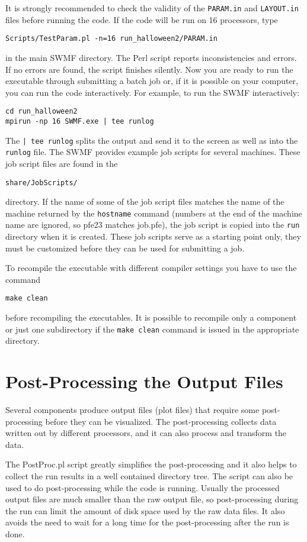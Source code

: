 It is strongly recommended to check the validity of the {\tt PARAM.in} and 
{\tt LAYOUT.in} files before running the code. If the
code will be run on 16 processors, type
\begin{verbatim}
Scripts/TestParam.pl -n=16 run_halloween2/PARAM.in
\end{verbatim}
in the main SWMF directory.
The Perl script reports inconsistencies and errors. 
If no errors are found, the script finishes silently.
Now you are ready to run the executable through submitting a batch job or, 
if it is possible on your computer, you can run the code interactively.  For
example, to run the SWMF interactively:
\begin{verbatim}
cd run_halloween2
mpirun -np 16 SWMF.exe | tee runlog
\end{verbatim}
The {\tt | tee runlog} splits the output and send it to the screen
as well as into the {\tt runlog} file.
The SWMF provides example job scripts for several machines. 
These job script files are found in the
\begin{verbatim}
share/JobScripts/
\end{verbatim}
directory. If the name of some of the job script files matches the
name of the machine returned by the {\tt hostname} command (numbers
at the end of the machine name are ignored, so pfe23 matches job.pfe), 
the job script is copied into the {\tt run} directory when it is created.
These job scripts serve as a starting point only, they must
be customized before they can be used for submitting a job.

To recompile the executable with different compiler settings you have
to use the command
\begin{verbatim}
make clean
\end{verbatim}
before recompiling the executables. It is possible to recompile
only a component or just one subdirectory if the {\tt make clean}
command is issued in the appropriate directory.

\section{Post-Processing the Output Files}

Several components produce output files (plot files) that require
some post-processing before they can be visualized. The post-processing
collects data written out by different processors, and it can also
process and transform the data. 

The PostProc.pl script greatly simplifies the post-processing and
it also helps to collect the run results in a well contained directory tree.
The script can also be used to do post-processing while the code is running.
Usually the processed output files are much smaller than the raw output file,
so post-processing during the run can limit the amount of disk space used
by the raw data files. It also avoids the need to wait for a long time 
for the post-processing after the run is done. 

